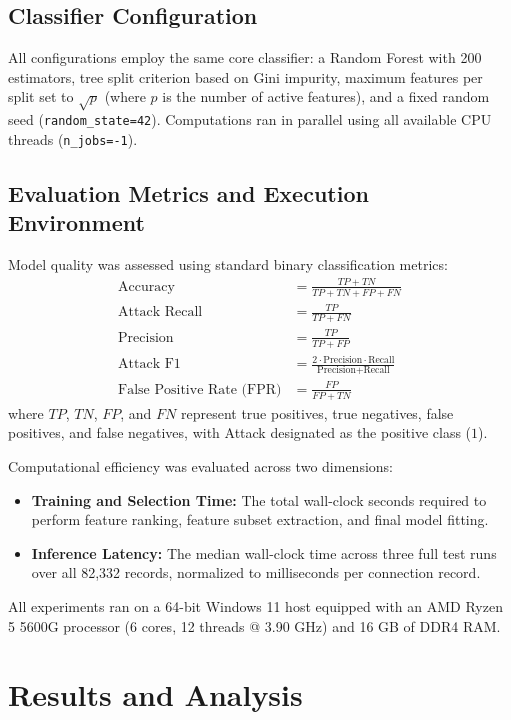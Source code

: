 \documentclass[conference]{IEEEtran}
\begin{document}
\subsection{Classifier Configuration}
All configurations employ the same core classifier: a Random Forest with 200 estimators, tree split criterion based on Gini impurity, maximum features per split set to $\sqrt{p}$ (where $p$ is the number of active features), and a fixed random seed (\texttt{random\_state=42}). Computations ran in parallel using all available CPU threads (\texttt{n\_jobs=-1}).

\subsection{Evaluation Metrics and Execution Environment}
Model quality was assessed using standard binary classification metrics:
\begin{align}
\text{Accuracy} &= \frac{TP + TN}{TP + TN + FP + FN} \\
\text{Attack Recall} &= \frac{TP}{TP + FN} \\
\text{Precision} &= \frac{TP}{TP + FP} \\
\text{Attack F1} &= \frac{2 \cdot \text{Precision} \cdot \text{Recall}}{\text{Precision} + \text{Recall}} \\
\text{False Positive Rate (FPR)} &= \frac{FP}{FP + TN}
\end{align}
where $TP$, $TN$, $FP$, and $FN$ represent true positives, true negatives, false positives, and false negatives, with Attack designated as the positive class ($1$).

Computational efficiency was evaluated across two dimensions:
\begin{itemize}
    \item \textbf{Training and Selection Time:} The total wall-clock seconds required to perform feature ranking, feature subset extraction, and final model fitting.
    \item \textbf{Inference Latency:} The median wall-clock time across three full test runs over all 82,332 records, normalized to milliseconds per connection record.
\end{itemize}
All experiments ran on a 64-bit Windows 11 host equipped with an AMD Ryzen 5 5600G processor (6 cores, 12 threads @ 3.90 GHz) and 16 GB of DDR4 RAM.

\section{Results and Analysis}
\end{document}
